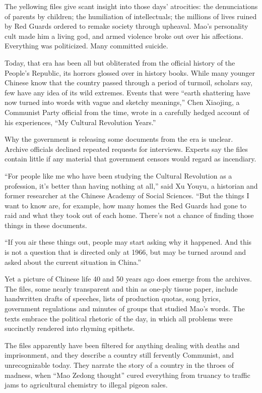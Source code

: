 ﻿\documentclass[12pt]{article}
\begin{document}
The yellowing files give scant insight into those days' atrocities: the denunciations of parents by
children; the humiliation of intellectuals; the millions of lives ruined by Red Guards ordered to
remake society through upheaval. Mao's personality cult made him a living god, and armed violence
broke out over his affections. Everything was politicized. Many committed suicide.

Today, that era has been all but obliterated from the official history of the People's Republic, its
horrors glossed over in history books. While many younger Chinese know that the country passed
through a period of turmoil, scholars say, few have any idea of its wild extremes. Events that were
``earth shattering have now turned into words with vague and sketchy meanings,'' Chen Xiaojing, a
Communist Party official from the time, wrote in a carefully hedged account of his experiences, ``My
Cultural Revolution Years.''

Why the government is releasing some documents from the era is unclear. Archive officials declined
repeated requests for interviews. Experts say the files contain little if any material that
government censors would regard as incendiary.

``For people like me who have been studying the Cultural Revolution as a profession, it's better
than having nothing at all,'' said Xu Youyu, a historian and former researcher at the Chinese
Academy of Social Sciences. ``But the things I want to know are, for example, how many homes the Red
Guards had gone to raid and what they took out of each home. There's not a chance of finding those
things in these documents.

``If you air these things out, people may start asking why it happened. And this is not a question
that is directed only at 1966, but may be turned around and asked about the current situation in
China.''

Yet a picture of Chinese life 40 and 50 years ago does emerge from the archives. The files, some
nearly transparent and thin as one-ply tissue paper, include handwritten drafts of speeches, lists
of production quotas, song lyrics, government regulations and minutes of groups that studied Mao's
words. The texts embrace the political rhetoric of the day, in which all problems were succinctly
rendered into rhyming epithets.

The files apparently have been filtered for anything dealing with deaths and imprisonment, and they
describe a country still fervently Communist, and unrecognizable today. They narrate the story of a
country in the throes of madness, when ``Mao Zedong thought'' cured everything from truancy to
traffic jams to agricultural chemistry to illegal pigeon sales.
\end{document}
